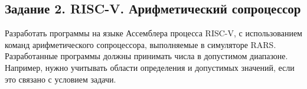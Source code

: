 \documentclass[a4paper, 12pt, oneside]{article}
\begin{document}
\begin{center}
\section*{Задание 2. RISC-V. Арифметический сопроцессор}
\end{center}

Разработать программы на языке Ассемблера процесса RISC-V, с использованием команд арифметического сопроцессора, выполняемые в симуляторе RARS. Разработанные программы должны принимать числа в допустимом диапазоне. Например, нужно учитывать области определения и допустимых значений, если это связано с условием задачи.
\end{document}
